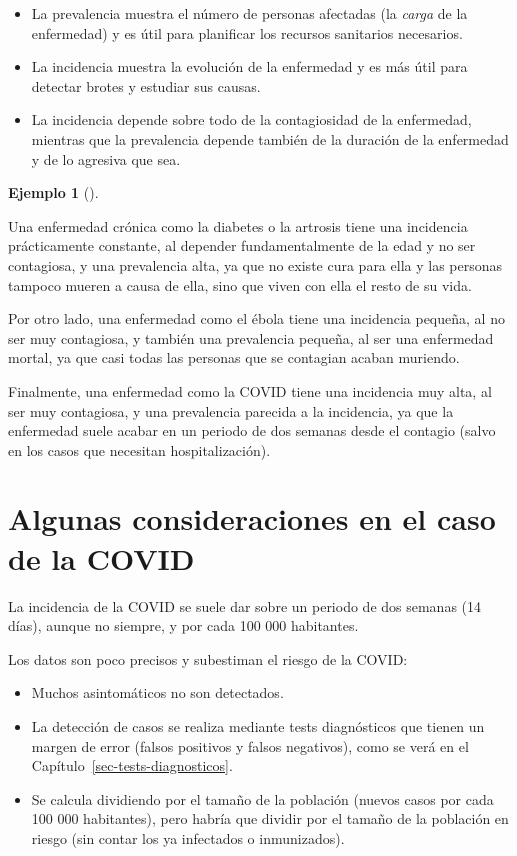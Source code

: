 \documentclass[
  spanish,
  a4paper,
]{scrreport}
\providecommand{\tightlist}{%
  \setlength{\itemsep}{0pt}\setlength{\parskip}{0pt}}
\theoremstyle{definition}
\theoremstyle{definition}
\newtheorem{example}{Ejemplo}[chapter]
\theoremstyle{remark}
\begin{document}
\begin{itemize}
\tightlist
\item
  La prevalencia muestra el número de personas afectadas (la
  \emph{carga} de la enfermedad) y es útil para planificar los recursos
  sanitarios necesarios.
\item
  La incidencia muestra la evolución de la enfermedad y es más útil para
  detectar brotes y estudiar sus causas.
\item
  La incidencia depende sobre todo de la contagiosidad de la enfermedad,
  mientras que la prevalencia depende también de la duración de la
  enfermedad y de lo agresiva que sea.
\end{itemize}

\begin{example}[]\protect\hypertarget{exm-prevalencia-incidencia}{}\label{exm-prevalencia-incidencia}

Una enfermedad crónica como la diabetes o la artrosis tiene una
incidencia prácticamente constante, al depender fundamentalmente de la
edad y no ser contagiosa, y una prevalencia alta, ya que no existe cura
para ella y las personas tampoco mueren a causa de ella, sino que viven
con ella el resto de su vida.

Por otro lado, una enfermedad como el ébola tiene una incidencia
pequeña, al no ser muy contagiosa, y también una prevalencia pequeña, al
ser una enfermedad mortal, ya que casi todas las personas que se
contagian acaban muriendo.

Finalmente, una enfermedad como la COVID tiene una incidencia muy alta,
al ser muy contagiosa, y una prevalencia parecida a la incidencia, ya
que la enfermedad suele acabar en un periodo de dos semanas desde el
contagio (salvo en los casos que necesitan hospitalización).

\end{example}

\section{Algunas consideraciones en el caso de la
COVID}\label{algunas-consideraciones-en-el-caso-de-la-covid}

La incidencia de la COVID se suele dar sobre un periodo de dos semanas
(14 días), aunque no siempre, y por cada 100 000 habitantes.

Los datos son poco precisos y subestiman el riesgo de la COVID:

\begin{itemize}
\tightlist
\item
  Muchos asintomáticos no son detectados.
\item
  La detección de casos se realiza mediante tests diagnósticos que
  tienen un margen de error (falsos positivos y falsos negativos), como
  se verá en el Capítulo~\ref{sec-tests-diagnosticos}.
\item
  Se calcula dividiendo por el tamaño de la población (nuevos casos por
  cada 100 000 habitantes), pero habría que dividir por el tamaño de la
  población en riesgo (sin contar los ya infectados o inmunizados).
\end{itemize}
\end{document}
